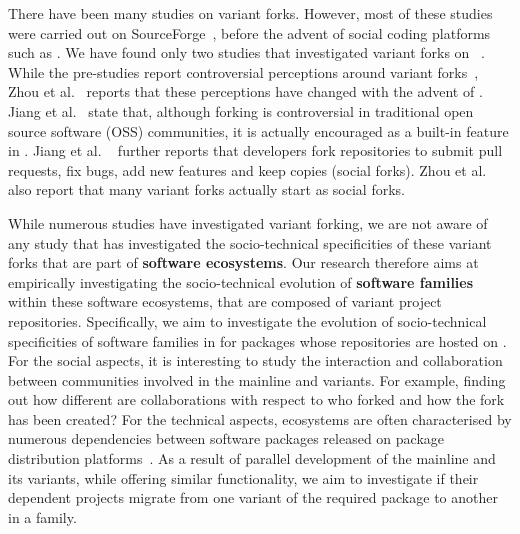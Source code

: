 There have been many studies on variant forks. However, most of these studies were carried out on \textsf{SourceForge}~\cite{Linus:2012Perspectives,Gregorio:2012,Viseur:2012Forks,Linus:2013CodeForking,Laurent:2008,Linus:2011ToFork}, before the advent of social coding platforms such as \gh.
We have found only two studies that investigated variant forks on \gh~\cite{businge2018appfamilies,Zhou:2020}.
While the pre-\gh studies report controversial perceptions around variant forks~\cite{Chua:Forking:2017,Dixion:2009Forks,Ernst:2010,Linus:2011ToFork,Linus:2014Hackers,Raymond:Cathedral:2001}, Zhou et al.~\cite{Zhou:2020} reports that these perceptions have changed with the advent of \gh. Jiang et al.~\cite{Lo:2017} state that, although forking is controversial in traditional open source software (OSS) communities, it is actually encouraged as a built-in feature in \gh. Jiang et al. ~\cite{Lo:2017} further reports that developers fork repositories to submit pull requests, fix bugs, add new features and keep copies (social forks).
Zhou et al.~\cite{Zhou:2020} also report that many variant forks actually start as social forks.

While numerous studies have investigated variant forking, we are not aware of any study that has investigated the socio-technical specificities of these variant forks that are part of \textbf{software ecosystems}.
Our research therefore aims at empirically investigating the socio-technical evolution of \textbf{software families} within these software ecosystems, that are composed of variant project repositories. Specifically, we aim to investigate the evolution of socio-technical specificities of software families in \npm for \js packages whose repositories are hosted on \gh.
For the social aspects, it is interesting to study the interaction and collaboration between communities involved in the mainline and variants.
For example, finding out how different are collaborations with respect to who forked and how the fork has been created?
For the technical aspects, ecosystems are often characterised by numerous dependencies between software packages released on package distribution platforms~\cite{decan:2016:ECSAW}. 
As a result of parallel development of the mainline and its variants, while offering similar functionality, we aim to investigate if their dependent projects migrate from one variant of the required package to another in a family.

